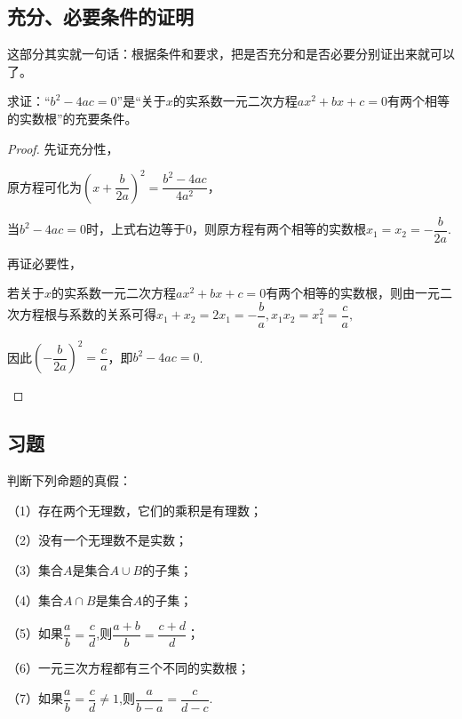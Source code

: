 \documentclass[lang=cn,math=cm,chinesefont=nofont,11pt,scheme=chinese,twocol]{elegantbook}
\begin{document}
\subsection{充分、必要条件的证明}

这部分其实就一句话：根据条件和要求，把是否充分和是否必要分别证出来就可以了。

\begin{example}\label{HS2FZ_lkb1_P26.1}
  求证：“$b^2-4ac=0$”是“关于$x$的实系数一元二次方程$ax^2+bx+c=0$有两个相等的实数根”的充要条件。
\end{example}

\begin{proof}
  先证充分性，

  原方程可化为$\left(x+\dfrac{b}{2a}\right)^{2}=\dfrac{b^{2}-4ac}{4a^{2}}$，

  当$b^2-4ac=0$时，上式右边等于0，则原方程有两个相等的实数根$x_1=x_2=-\dfrac{b}{2a}$.

  再证必要性，
  
\begin{spacing}{1.8}
  若关于$x$的实系数一元二次方程$ax^2+bx+c=0$有两个相等的实数根，则由一元二次方程根与系数的关系可得$x_{1}+x_{2}=2x_{1}=-\dfrac{b}{a},x_{1}x_{2}=x_{1}^{2}=\dfrac{c}{a},$

  因此$\left(-\dfrac{b}{2a}\right)^{2}=\dfrac{c}{a}$，即$b^2-4ac=0$.
\end{spacing}

\end{proof}

\subsection{习题}

\begin{exercise}\label{2017RJB_bx1_P26}
  判断下列命题的真假：

  （1）存在两个无理数，它们的乘积是有理数；

  （2）没有一个无理数不是实数；

  （3）集合$A$是集合$A\cup B$的子集；

  （4）集合$A\cap B$是集合$A$的子集；

\begin{spacing}{2.0}
    （5）如果$\dfrac ab=\dfrac cd$,则$\dfrac{a+b}b=\dfrac{c+d}{d}$；

  （6）一元三次方程都有三个不同的实数根；
  
  （7）如果$\dfrac ab=\dfrac cd\neq 1$,则$\dfrac a{b-a}=\dfrac c{d-c}$.
\end{spacing}

\end{exercise}
\end{document}

